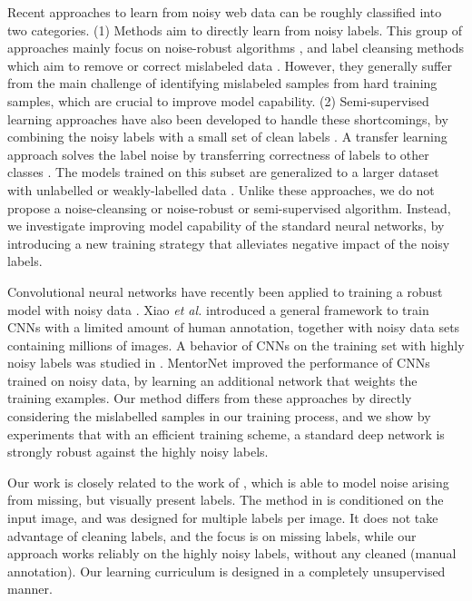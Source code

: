 \documentclass[runningheads]{llncs}
\begin{document}
Recent approaches to learn from noisy web data can be roughly classified into two categories. (1) Methods aim to directly learn from noisy labels. This group of approaches mainly focus on noise-robust algorithms \cite{larsen1998design,xiao2015learning,Patrini2017}, and label cleansing methods which aim to remove or correct mislabeled data \cite{Brodley1999,jiang2017mentornet}. However, they generally suffer from the main challenge of identifying mislabeled samples from hard training samples, which are crucial to improve model capability.
(2) Semi-supervised learning approaches have also been developed to handle these shortcomings, by combining the noisy labels with a small set of clean labels \cite{Zhu2005,Fergus2009,Chen2013}.  A transfer learning approach solves the label noise by transferring correctness of labels to other classes \cite{Lee2017}. The models trained on this subset are generalized to a larger dataset with unlabelled or weakly-labelled data \cite{Veit2017}.  Unlike these approaches, we do not propose a noise-cleansing or noise-robust or semi-supervised algorithm. Instead, we investigate improving model capability of the standard neural networks, by introducing a new training strategy that alleviates negative impact of the noisy labels.

Convolutional neural networks have recently been applied to training a robust model with noisy data \cite{xiao2015learning,rolnick2017deep,Patrini2017,Lee2017,jiang2017mentornet}.  Xiao \emph{et al.} \cite{xiao2015learning} introduced a general framework to train CNNs with a limited amount of human annotation, together with noisy data sets containing millions of images.   A  behavior of CNNs on the training set with highly noisy labels was studied in \cite{rolnick2017deep}.  MentorNet \cite{jiang2017mentornet} improved the performance of CNNs trained on noisy data, by learning an additional network that weights the training examples. Our method differs from these approaches by directly considering the mislabelled samples in our training process, and we show by experiments that with an efficient training scheme, a standard deep network is strongly robust against the highly noisy labels.


Our work is closely related to the work of \cite{Misra2016}, which is able to model noise arising from missing, but visually present labels. The method in \cite{Misra2016} is conditioned on the input image, and was designed
for multiple labels per image. It does not take advantage of cleaning labels, and the focus is on missing labels, while our approach works reliably on the highly noisy labels, without any cleaned (manual annotation). Our learning curriculum is designed in a completely unsupervised manner.
\end{document}
